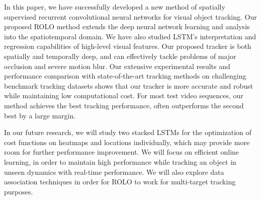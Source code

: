 \documentclass{article}
\begin{document}
In this paper, we have successfully developed a new method of spatially supervised recurrent convolutional neural networks for visual object tracking.  Our proposed ROLO method extends the deep neural network learning and analysis into the spatiotemporal domain.
We have also studied LSTM's interpretation and regression capabilities of high-level visual features. Our proposed tracker is both spatially and temporally deep, and can effectively tackle problems of major occlusion and severe motion blur.
Our extensive experimental results and performance comparison with state-of-the-art tracking methods on challenging benchmark tracking datasets shows that our tracker is more accurate and robust while maintaining low computational cost. For most test video sequences, our method achieves the best tracking performance, often outperforms the second best by a large margin.

In  our future research, we will study two stacked LSTMs for the optimization of cost functions on heatmaps and locations individually, which may provide more room for further performance improvement. %
We will focus on efficient online learning, in order to maintain high performance while tracking an object in unseen dynamics with real-time performance. We will also explore data association techniques in order for ROLO to work for multi-target tracking purposes.

%

\small

\end{document}
